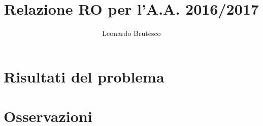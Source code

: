 \documentclass[11pt]{article}
\title{Relazione RO per l'A.A. 2016/2017}
\author{Leonardo Brutesco}
\begin{document}









	\section{Risultati del problema}
	\newpage

	\section{Osservazioni}
	\newpage



	
	\newpage
\end{document}
